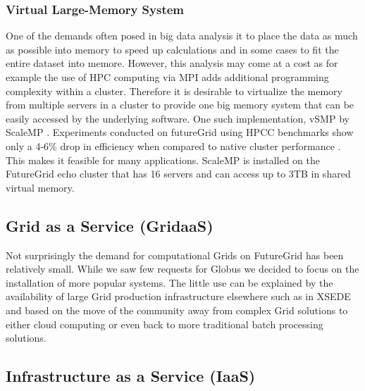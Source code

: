 \subsubsection{Virtual Large-Memory System}

One of the demands often posed in big data analysis it to place the data as much as possible into memory to speed up calculations and in some cases to fit the entire dataset into memore. However, this analysis may come at a cost as for example the use of HPC computing via MPI adds additional programming complexity within a cluster. Therefore it is desirable to virtualize the memory from multiple servers in a cluster to provide one big memory system that can be easily accessed by the underlying software. 
One such implementation, vSMP by ScaleMP \cite{www-scalemp}.
Experiments conducted on futureGrid using HPCC
benchmarks show only a 4-6\% drop in efficiency when compared to native
cluster performance \cite{las12fg-bookchapter}. This makes it feasible for many applications. ScaleMP is installed on the FutureGrid echo cluster that has 16 servers and can access up to 3TB in shared virtual memory.

\subsection{Grid as a Service (GridaaS)}

Not surprisingly the demand for computational Grids on FutureGrid has been relatively small. While we saw few requests for Globus we decided to focus on the installation of more popular systems. The little use can be explained by the availability of large Grid production infrastructure elsewhere such as in XSEDE and based on the move of the community away from complex Grid solutions to either cloud computing or even back to more traditional batch processing solutions.


\subsection{Infrastructure as a Service (IaaS)}

